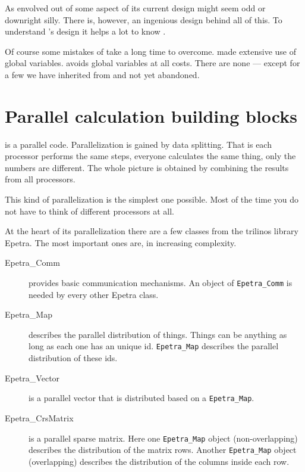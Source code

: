 As \baci{} envolved out of \ccarat{} some aspect of its current design might
seem odd or downright silly. There is, however, an ingenious design behind all
of this. To understand \baci{}'s design it helps a lot to know \ccarat{}.


Of course some mistakes of \ccarat{} take a long time to overcome. \ccarat{}
made extensive use of global variables. \baci{} avoids global variables at all
costs. There are none --- except for a few we have inherited from \ccarat{}
and not yet abandoned.

\section{Parallel calculation building blocks}

\baci{} is a parallel code. Parallelization is gained by data splitting. That
is each processor performs the same steps, everyone calculates the same thing,
only the numbers are different. The whole picture is obtained by combining the
results from all processors.

This kind of parallelization is the simplest one possible. Most of the time
you do not have to think of different processors at all. 

At the heart of its parallelization there are a few classes from the trilinos
library Epetra. The most important ones are, in increasing complexity.

\begin{description}

\item [Epetra\_Comm] provides basic communication mechanisms. An object of
\texttt{Epetra\_Comm} is needed by every other Epetra class.

\item [Epetra\_Map] describes the parallel distribution of things. Things can
be anything as long as each one has an unique id. \texttt{Epetra\_Map}
describes the parallel distribution of these ids.

\item [Epetra\_Vector] is a parallel vector that is distributed based on a
\texttt{Epetra\_Map}. 

\item [Epetra\_CrsMatrix] is a parallel sparse matrix. Here one
\texttt{Epetra\_Map} object (non-overlapping) describes the distribution of
the matrix rows. Another \texttt{Epetra\_Map} object (overlapping) describes
the distribution of the columns inside each row.

\end{description}

